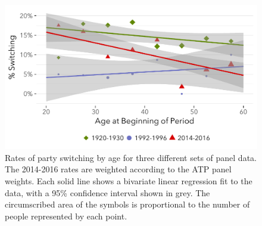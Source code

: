 \documentclass[11pt]{scrartcl}\usepackage[]{graphicx}\usepackage[]{color}
\makeatletter
\def\maxwidth{ %
  \ifdim\Gin@nat@width>\linewidth
    \linewidth
  \else
    \Gin@nat@width
  \fi
}
\newenvironment{knitrout}{}{} %
\makeatother
\begin{document}
\begin{knitrout}
\color{fgcolor}\begin{figure}

{\centering \includegraphics[width=\maxwidth]{figures/plots-switching_by_age-1} 

}

\caption[Rates of party switching by age for three different sets of panel data]{Rates of party switching by age for three different sets of panel data. The 2014-2016 rates are weighted according to the ATP panel weights. Each solid line shows a bivariate linear regression fit to the data, with a 95\% confidence interval shown in grey. The circumscribed area of the symbols is proportional to the number of people represented by each point.}\label{fig:switching_by_age}
\end{figure}


\end{knitrout}
% 
% 
% 
\end{document}
